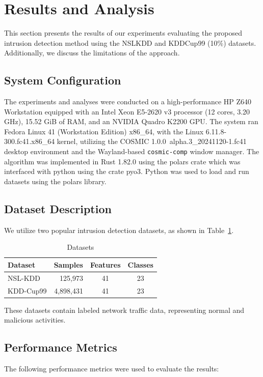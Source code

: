 \documentclass[pdflatex,sn-mathphys-num]{sn-jnl}%
\let\oldcaption\caption
\renewcommand{\caption}[1]{\oldcaption{\centering #1}}
\theoremstyle{thmstyleone}%
\theoremstyle{thmstyletwo}%
\theoremstyle{thmstylethree}%
\begin{document}
\section{Results and Analysis}\label{sec:Results}
This section presents the results of our experiments evaluating the proposed intrusion detection method using the NSLKDD and KDDCup99 (10\%) datasets.
Additionally, we discuss the limitations of the approach.


\subsection{System Configuration}

The experiments and analyses were conducted on a high-performance HP Z640 Workstation equipped with an Intel Xeon E5-2620 v3 processor (12 cores, 3.20 GHz), 15.52 GiB of RAM, and an NVIDIA Quadro K2200 GPU. The system ran Fedora Linux 41 (Workstation Edition) x86\_64, with the Linux 6.11.8-300.fc41.x86\_64 kernel, utilizing the COSMIC 1.0.0~alpha.3\_20241120-1.fc41 desktop environment and the Wayland-based \texttt{cosmic-comp} window manager.
The algorithm was implemented in Rust 1.82.0 using the polars crate which was interfaced with python using the crate pyo3. Python was used to load and run datasets using the polars library.

\subsection{Dataset Description}
We utilize two popular intrusion detection datasets, as shown in Table~\ref{tab:dataset}.
\begin{table}[ht!]
    \centering
    \caption{Datasets}
    \begin{tabular}{|l|r|c|c|}
        \hline
        \textbf{Dataset} & \textbf{Samples} & \textbf{Features} & \textbf{Classes} \\
        \hline
        NSL-KDD \cite{DATA1} & 125,973 & 41 & 23 \\
        \hline
        KDD-Cup99 \cite{DATA2}  & 4,898,431 & 41 & 23 \\
        \hline
    \end{tabular}
    \label{tab:dataset}
\end{table}
These datasets contain labeled network traffic data, representing normal and malicious activities.

\subsection{Performance Metrics}
The following performance metrics were used to evaluate the results:
\end{document}
